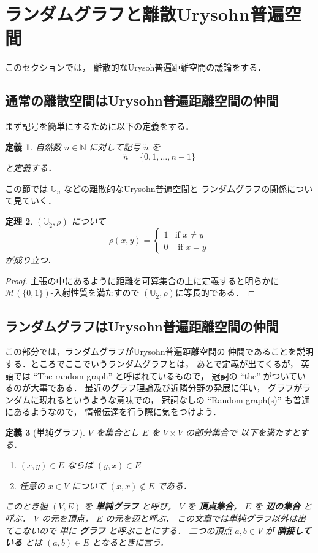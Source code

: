 \documentclass[leqno, 12pt]{jsarticle}
\newtheorem{thm}{定理}[section]
\newtheorem{df}[thm]{定義}
\newcommand{\nn}{\mathbb{N}}
\begin{document}
\newpage
\section{ランダムグラフと離散Urysohn普遍空間}\label{sec:risan}
このセクションでは，
離散的なUrysoh普遍距離空間の議論をする．
\subsection{通常の離散空間はUrysohn普遍距離空間の仲間}
まず記号を簡単にするために以下の定義をする．
\begin{df}\label{df:rand:numb}
自然数
$n\in \nn$
に対して記号
$\breve{n}$
を
\[
\breve{n}=\{0, 1, \dots, n-1\}
\]
と定義する．
\end{df}
この節では
$\mathbb{U}_{\breve{n}}$
などの離散的なUrysohn普遍空間と
ランダムグラフの関係について見ていく．


\begin{thm}\label{thm:rand:risan}
$(\mathbb{U}_{\breve{2}}, \rho)$
について
\[
\rho(x, y)=
\begin{cases}
1 & \text{if $x\neq y$}\\
0 & \text{ if $x=y$}
\end{cases}
\]
が成り立つ．
\end{thm}
\begin{proof}
主張の中にあるように距離を可算集合の上に定義すると明らかに
$\mathscr{M}(\{0, 1\})$-入射性質を満たすので
$(\mathbb{U}_{\breve{2}}, \rho)$に等長的である．
\end{proof}


\subsection{ランダムグラフはUrysohn普遍距離空間の仲間}
この部分では，ランダムグラフがUrysohn普遍距離空間の
仲間であることを説明する．ところでここでいうランダムグラフとは，
あとで定義が出てくるが，
英語では
``The random graph''
と呼ばれているもので，
冠詞の
``the''
がついているのが大事である．
最近のグラフ理論及び近隣分野の発展に伴い，
グラフがランダムに現れるというような意味での，
冠詞なしの
``Random graph(s)''
も普通にあるようなので，
情報伝達を行う際に気をつけよう．
\begin{df}[単純グラフ]\label{df:rand:graph}
$V$
を集合とし
$E$
を
$V\times V$
の部分集合で
以下を満たすとする．
\begin{enumerate}
\item 
$(x, y)\in E$
ならば
$(y, x)\in E$
\item 
任意の
$x\in V$
について
$(x, x)\not\in E$
である．
\end{enumerate}
このとき組
$(V, E)$
を
\textbf{単純グラフ}
と呼び，
$V$
を
\textbf{頂点集合}，
$E$
を
\textbf{辺の集合}
と呼ぶ．
$V$
の元を頂点，
$E$
の元を辺と呼ぶ．
この文章では単純グラフ以外は出てこないので
単に
\textbf{グラフ}
と呼ぶことにする．
二つの頂点
$a, b\in V$
が
\textbf{隣接している}
とは
$(a, b)\in E$
となるときに言う．
\end{df}
\end{document}
